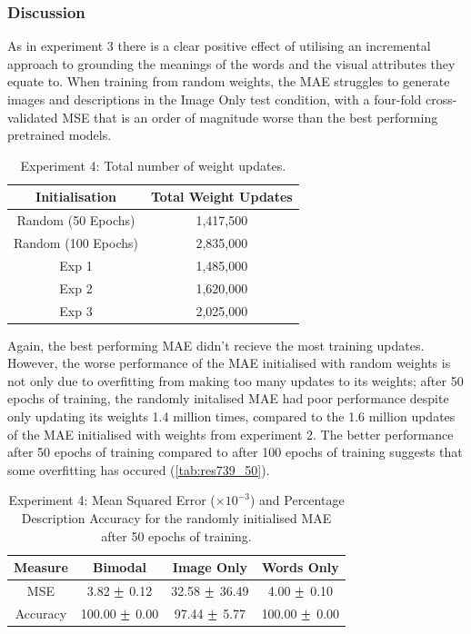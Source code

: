 \subsubsection{Discussion}
As in experiment 3 there is a clear positive effect of utilising an incremental approach to grounding the meanings of the words and the visual attributes they equate to. 
When training from random weights, the \ac{MAE} struggles to generate images and descriptions in the Image Only test condition, with a four-fold cross-validated \ac{MSE} that is an order of magnitude worse than the best performing pretrained models.

\begin{table}
\centering
\begin{tabular}{|c|c|}
\hline
\textbf{Initialisation} & \textbf{Total Weight Updates}\\ \hline
Random (50 Epochs) &  1,417,500\\ \hline
Random (100 Epochs) & 2,835,000\\ \hline
Exp 1 & 1,485,000\\ \hline
Exp 2 & 1,620,000\\ \hline
Exp 3 &	2,025,000\\ \hline

\end{tabular}
\caption{Experiment 4: Total number of weight updates.}
\label{tab:updatesTotal4}
\end{table}

Again, the best performing \ac{MAE} didn't recieve the most training updates. However, the worse performance of the \ac{MAE} initialised with random weights is not only due to overfitting from making too many updates to its weights; after 50 epochs of training, the randomly initalised MAE had poor performance despite only updating its weights 1.4 million times, compared to the 1.6 million updates of the \ac{MAE} initialised with weights from experiment 2. The better performance after 50 epochs  of training compared to after 100 epochs of training suggests that some overfitting has occured (\autoref{tab:res739_50}).

\begin{table}[h!]
\centering
\begin{tabular}{|c|c|c|c|}
	\hline
	\textbf{Measure} & 	\textbf{Bimodal} & 	\textbf{Image Only} 	& 	\textbf{Words Only} \\ \hline
MSE	&	3.82	$\mypm$	0.12	&	32.58	$\mypm$	36.49	&	4.00	$\mypm$	0.10	\\ \hline
Accuracy	&	100.00	$\mypm$	0.00	&	97.44	$\mypm$	5.77	&	100.00	$\mypm$	0.00\\ \hline
\end{tabular}

\caption{Experiment 4: Mean Squared Error ($\times10^{-3}$) and Percentage Description Accuracy for the randomly initialised MAE after 50 epochs of training.} 
\label{tab:res739_50}
\end{table}



